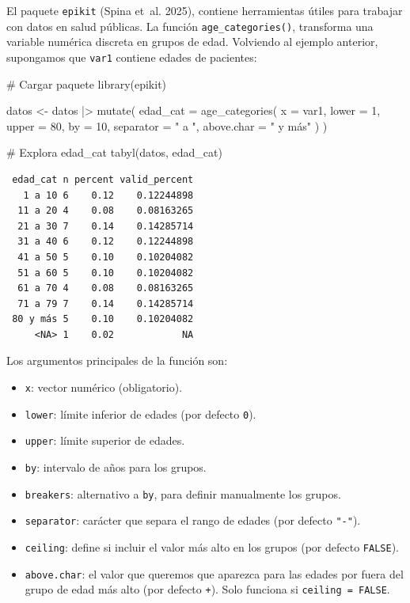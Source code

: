 \documentclass[
  spanish,
  a4paper,
]{scrbook}
\newenvironment{Shaded}{\begin{snugshade}}{\end{snugshade}}
\newcommand{\AttributeTok}[1]{\textcolor[rgb]{0.40,0.45,0.13}{#1}}
\newcommand{\CommentTok}[1]{\textcolor[rgb]{0.37,0.37,0.37}{#1}}
\newcommand{\DecValTok}[1]{\textcolor[rgb]{0.68,0.00,0.00}{#1}}
\newcommand{\FunctionTok}[1]{\textcolor[rgb]{0.28,0.35,0.67}{#1}}
\newcommand{\NormalTok}[1]{\textcolor[rgb]{0.00,0.23,0.31}{#1}}
\newcommand{\OtherTok}[1]{\textcolor[rgb]{0.00,0.23,0.31}{#1}}
\newcommand{\SpecialCharTok}[1]{\textcolor[rgb]{0.37,0.37,0.37}{#1}}
\newcommand{\StringTok}[1]{\textcolor[rgb]{0.13,0.47,0.30}{#1}}
\begin{document}
El paquete \texttt{epikit} (Spina et~al. 2025), contiene herramientas
útiles para trabajar con datos en salud públicas. La función
\texttt{age\_categories()}, transforma una variable numérica discreta en
grupos de edad. Volviendo al ejemplo anterior, supongamos que
\texttt{var1} contiene edades de pacientes:

\begin{Shaded}
\begin{Highlighting}[]
\CommentTok{\# Cargar paquete}
\FunctionTok{library}\NormalTok{(epikit)}

\NormalTok{datos }\OtherTok{\textless{}{-}}\NormalTok{ datos }\SpecialCharTok{|\textgreater{}}
  \FunctionTok{mutate}\NormalTok{(}
    \AttributeTok{edad\_cat =} \FunctionTok{age\_categories}\NormalTok{(}
      \AttributeTok{x =}\NormalTok{ var1,}
      \AttributeTok{lower =} \DecValTok{1}\NormalTok{,}
      \AttributeTok{upper =} \DecValTok{80}\NormalTok{,}
      \AttributeTok{by =} \DecValTok{10}\NormalTok{,}
      \AttributeTok{separator =} \StringTok{" a "}\NormalTok{,}
      \AttributeTok{above.char =} \StringTok{" y más"}
\NormalTok{    )}
\NormalTok{  )}

\CommentTok{\# Explora edad\_cat}
\FunctionTok{tabyl}\NormalTok{(datos, edad\_cat)}
\end{Highlighting}
\end{Shaded}

\begin{verbatim}
 edad_cat n percent valid_percent
   1 a 10 6    0.12    0.12244898
  11 a 20 4    0.08    0.08163265
  21 a 30 7    0.14    0.14285714
  31 a 40 6    0.12    0.12244898
  41 a 50 5    0.10    0.10204082
  51 a 60 5    0.10    0.10204082
  61 a 70 4    0.08    0.08163265
  71 a 79 7    0.14    0.14285714
 80 y más 5    0.10    0.10204082
     <NA> 1    0.02            NA
\end{verbatim}

Los argumentos principales de la función son:

\begin{itemize}
\item
  \texttt{x}: vector numérico (obligatorio).
\item
  \texttt{lower}: límite inferior de edades (por defecto \texttt{0}).
\item
  \texttt{upper}: límite superior de edades.
\item
  \texttt{by}: intervalo de años para los grupos.
\item
  \texttt{breakers}: alternativo a \texttt{by}, para definir manualmente
  los grupos.
\item
  \texttt{separator}: carácter que separa el rango de edades (por
  defecto \texttt{"-"}).
\item
  \texttt{ceiling}: define si incluir el valor más alto en los grupos
  (por defecto \texttt{FALSE}).
\item
  \texttt{above.char}: el valor que queremos que aparezca para las
  edades por fuera del grupo de edad más alto (por defecto \texttt{+}).
  Solo funciona si \texttt{ceiling\ =\ FALSE}.
\end{itemize}
\end{document}
